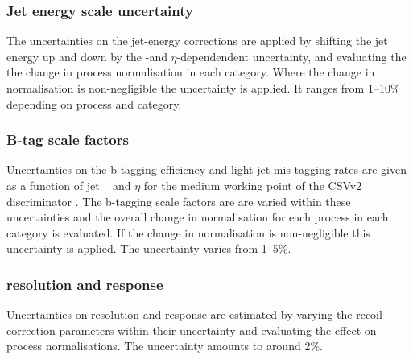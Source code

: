 \subsubsection*{Jet energy scale uncertainty}
The uncertainties on the jet-energy corrections are applied
by shifting the jet energy up and down by the \pT-and $\eta$-dependendent
uncertainty, and evaluating the the change in process normalisation in
each category. Where the change in normalisation is non-negligible the
uncertainty is applied. It ranges from 1--10\% depending on process and category.
\subsubsection*{B-tag scale factors}
Uncertainties on the b-tagging efficiency and light jet mis-tagging
rates are given as a function of jet \pT~ and $\eta$ for the 
medium working point of the \ac{CSV}v2 discriminator \cite{cms-btag-run2}.
The b-tagging scale factors are are varied within these uncertainties
and the overall change in normalisation for each process in each category is
evaluated. If the change in normalisation is non-negligible this
uncertainty is applied. The uncertainty varies from 1--5\%.
\subsubsection*{\MET resolution and response}
Uncertainties on \MET resolution and response are estimated
by varying the recoil correction parameters within their
uncertainty and evaluating the effect on process
normalisations. The uncertainty amounts to around 2\%.
